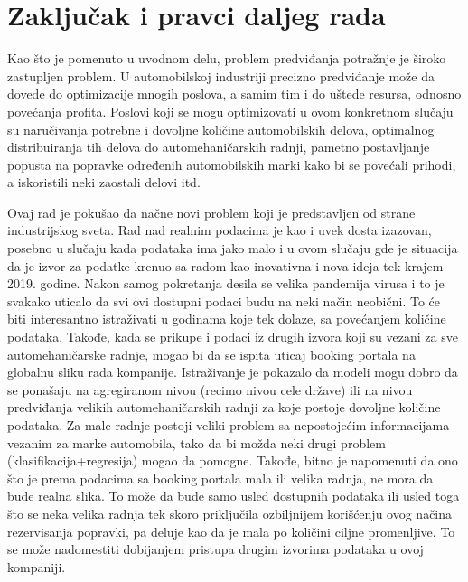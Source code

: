 \documentclass[12pt,oneside]{memoir}
\begin{document}
\chapter{Zaključak i pravci daljeg rada}
Kao što je pomenuto u uvodnom delu, problem predviđanja potražnje je široko zastupljen problem. U automobilskoj industriji precizno predviđanje može da dovede do optimizacije mnogih poslova, a samim tim i do uštede resursa, odnosno povećanja profita. Poslovi koji se mogu optimizovati u ovom konkretnom slučaju su naručivanja potrebne i dovoljne količine automobilskih delova, optimalnog distribuiranja tih delova do automehaničarskih radnji, pametno postavljanje popusta na popravke određenih automobilskih marki kako bi se povećali prihodi, a iskoristili neki zaostali delovi itd.

Ovaj rad je pokušao da načne novi problem koji je predstavljen od strane industrijskog sveta. Rad nad realnim podacima je kao i uvek dosta izazovan, posebno u slučaju kada podataka ima jako malo i u ovom slučaju gde je situacija da je izvor za podatke krenuo sa radom kao inovativna i nova ideja tek krajem 2019. godine. Nakon samog pokretanja desila se velika pandemija virusa i to je svakako uticalo da svi ovi dostupni podaci budu na neki način neobični. To će biti interesantno istraživati u godinama koje tek dolaze, sa povećanjem količine podataka. Takođe, kada se prikupe i podaci iz drugih izvora koji su vezani za sve automehaničarske radnje, mogao bi da se ispita uticaj booking portala na globalnu sliku rada kompanije. Istraživanje je pokazalo da modeli mogu dobro da se ponašaju na agregiranom nivou (recimo nivou cele države) ili na nivou predviđanja velikih automehaničarskih radnji za koje postoje dovoljne količine podataka. Za male radnje postoji veliki problem sa nepostojećim informacijama vezanim za marke automobila, tako da bi možda neki drugi problem (klasifikacija+regresija) mogao da pomogne. Takođe, bitno je napomenuti da ono što je prema podacima sa booking portala mala ili velika radnja, ne mora da bude realna slika. To može da bude samo usled dostupnih podataka ili usled toga što se neka velika radnja tek skoro priključila ozbiljnijem korišćenju ovog načina rezervisanja popravki, pa deluje kao da je mala po količini ciljne promenljive. To se može nadomestiti dobijanjem pristupa drugim izvorima podataka u ovoj kompaniji.
\end{document}
